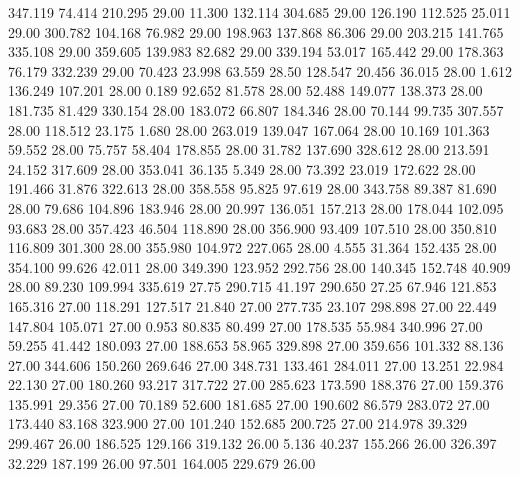  347.119   74.414  210.295        29.00
  11.300  132.114  304.685        29.00
 126.190  112.525   25.011        29.00
 300.782  104.168   76.982        29.00
 198.963  137.868   86.306        29.00
 203.215  141.765  335.108        29.00
 359.605  139.983   82.682        29.00
 339.194   53.017  165.442        29.00
 178.363   76.179  332.239        29.00
  70.423   23.998   63.559        28.50
 128.547   20.456   36.015        28.00
   1.612  136.249  107.201        28.00
   0.189   92.652   81.578        28.00
  52.488  149.077  138.373        28.00
 181.735   81.429  330.154        28.00
 183.072   66.807  184.346        28.00
  70.144   99.735  307.557        28.00
 118.512   23.175    1.680        28.00
 263.019  139.047  167.064        28.00
  10.169  101.363   59.552        28.00
  75.757   58.404  178.855        28.00
  31.782  137.690  328.612        28.00
 213.591   24.152  317.609        28.00
 353.041   36.135    5.349        28.00
  73.392   23.019  172.622        28.00
 191.466   31.876  322.613        28.00
 358.558   95.825   97.619        28.00
 343.758   89.387   81.690        28.00
  79.686  104.896  183.946        28.00
  20.997  136.051  157.213        28.00
 178.044  102.095   93.683        28.00
 357.423   46.504  118.890        28.00
 356.900   93.409  107.510        28.00
 350.810  116.809  301.300        28.00
 355.980  104.972  227.065        28.00
   4.555   31.364  152.435        28.00
 354.100   99.626   42.011        28.00
 349.390  123.952  292.756        28.00
 140.345  152.748   40.909        28.00
  89.230  109.994  335.619        27.75
 290.715   41.197  290.650        27.25
  67.946  121.853  165.316        27.00
 118.291  127.517   21.840        27.00
 277.735   23.107  298.898        27.00
  22.449  147.804  105.071        27.00
   0.953   80.835   80.499        27.00
 178.535   55.984  340.996        27.00
  59.255   41.442  180.093        27.00
 188.653   58.965  329.898        27.00
 359.656  101.332   88.136        27.00
 344.606  150.260  269.646        27.00
 348.731  133.461  284.011        27.00
  13.251   22.984   22.130        27.00
 180.260   93.217  317.722        27.00
 285.623  173.590  188.376        27.00
 159.376  135.991   29.356        27.00
  70.189   52.600  181.685        27.00
 190.602   86.579  283.072        27.00
 173.440   83.168  323.900        27.00
 101.240  152.685  200.725        27.00
 214.978   39.329  299.467        26.00
 186.525  129.166  319.132        26.00
   5.136   40.237  155.266        26.00
 326.397   32.229  187.199        26.00
  97.501  164.005  229.679        26.00
